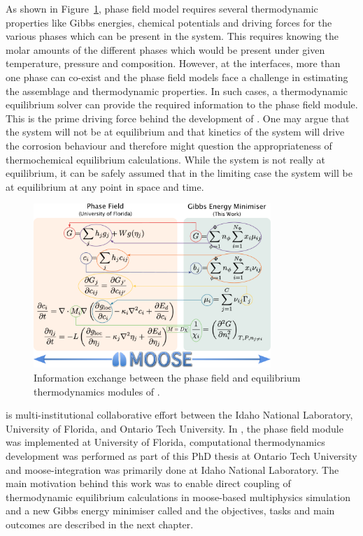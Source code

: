 	As shown in Figure~\ref{fig:yj_io}, {\YJ} phase field model requires several thermodynamic properties like Gibbs energies, chemical potentials and driving forces for the various phases which can be present in the system. This requires knowing the molar amounts of the different phases which would be present under given temperature, pressure and composition. However, at the interfaces, more than one phase can co-exist and the phase field models face a challenge in estimating the assemblage and thermodynamic properties. In such cases, a thermodynamic equilibrium solver can provide the required information to the phase field module. This is the prime driving force behind the development of {\GEM}. One may argue that the system will not be at equilibrium and that kinetics of the system will drive the corrosion behaviour and therefore might question the appropriateness of thermochemical equilibrium calculations. While the system is not really at equilibrium, it can be safely assumed that in the limiting case the system will be at equilibrium at any point in space and time.
	\begin{figure}[htb]
		\centering
		\includegraphics[width=0.8\textwidth]{figures/chapter-1/YJ_PF_IO.pdf}
		\caption{Information exchange between the phase field and equilibrium thermodynamics modules of \YJ.}
		\label{fig:yj_io}
	\end{figure} 	

	{\YJ} is multi-institutional collaborative effort between the Idaho National Laboratory, University of Florida, and Ontario Tech University.  In {\YJ}, the phase field module was implemented at University of Florida, computational thermodynamics development was performed as part of this PhD thesis at Ontario Tech University and \gls{moose}-integration was primarily done at Idaho National Laboratory. The main motivation behind this work was to enable direct coupling of thermodynamic equilibrium calculations in \gls{moose}-based multiphysics simulation and a new Gibbs energy minimiser called {\GEM} and the objectives, tasks and main outcomes are described in the next chapter.
	
